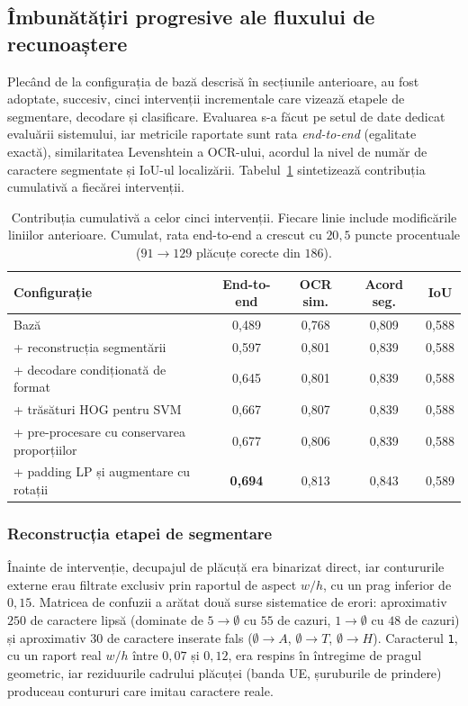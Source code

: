 \subsection{Îmbunătățiri progresive ale fluxului de recunoaștere}\label{sec:imbunatatiri}
\indent\par
Plecând de la configurația de bază descrisă în secțiunile anterioare, au fost adoptate, succesiv, cinci intervenții incrementale care vizează etapele de segmentare, decodare și clasificare. Evaluarea s-a făcut pe setul de date dedicat evaluării sistemului, iar metricile raportate sunt rata \textit{end-to-end} (egalitate exactă), similaritatea Levenshtein a OCR-ului, acordul la nivel de număr de caractere segmentate și IoU-ul localizării. Tabelul~\ref{tab:imbunatatiri} sintetizează contribuția cumulativă a fiecărei intervenții.

\begin{table}[H]
  \centering
  \small
  \begin{tabular}{p{6.2cm}cccc}
    \hline
    Configurație & End-to-end & OCR sim. & Acord seg. & IoU \\
    \hline
    Bază & 0{,}489 & 0{,}768 & 0{,}809 & 0{,}588 \\
    \quad + reconstrucția segmentării  & 0{,}597 & 0{,}801 & 0{,}839 & 0{,}588 \\
    \quad + decodare condiționată de format & 0{,}645 & 0{,}801 & 0{,}839 & 0{,}588 \\
    \quad + trăsături HOG pentru SVM & 0{,}667 & 0{,}807 & 0{,}839 & 0{,}588 \\
    \quad + pre-procesare cu conservarea proporțiilor & 0{,}677 & 0{,}806 & 0{,}839 & 0{,}588 \\
    \quad + padding LP și augmentare cu rotații & \textbf{0{,}694} & 0{,}813 & 0{,}843 & 0{,}589 \\
    \hline
  \end{tabular}
  \caption{Contribuția cumulativă a celor cinci intervenții. Fiecare linie include modificările liniilor anterioare. Cumulat, rata end-to-end a crescut cu $20{,}5$ puncte procentuale ($91 \to 129$ plăcuțe corecte din $186$).}
  \label{tab:imbunatatiri}
\end{table}

\subsubsection{Reconstrucția etapei de segmentare}
\indent\par
Înainte de intervenție, decupajul de plăcuță era binarizat direct, iar contururile externe erau filtrate exclusiv prin raportul de aspect $w/h$, cu un prag inferior de $0{,}15$. Matricea de confuzii a arătat două surse sistematice de erori: aproximativ $250$ de caractere lipsă (dominate de $5\to\emptyset$ cu $55$ de cazuri, $1\to\emptyset$ cu $48$ de cazuri) și aproximativ $30$ de caractere inserate fals ($\emptyset\to A$, $\emptyset\to T$, $\emptyset\to H$). Caracterul \texttt{1}, cu un raport real $w/h$ între $0{,}07$ și $0{,}12$, era respins în întregime de pragul geometric, iar reziduurile cadrului plăcuței (banda UE, șuruburile de prindere) produceau contururi care imitau caractere reale.


